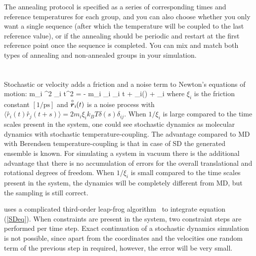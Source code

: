 The annealing protocol is specified as a series of corresponding times and 
reference temperatures for each group, and you can also choose whether you only
want a single sequence (after which the temperature will be coupled to the 
last reference value), or if the annealing should be periodic and restart at 
the first reference point once the sequence is completed. You can mix and
match both types of annealing and non-annealed groups in your simulation.

\newcommand{\vrond}{\stackrel{\circ}{\ve{r}}}
\newcommand{\rond}{\stackrel{\circ}{r}}
\newcommand{\ruis}{\ve{r}^G}

\section{}
\label{sec:SD}
Stochastic or velocity  adds a friction
and a noise term to Newton's equations of motion:
\beq
\label{SDeq}
m_i {\de^2 _i \over \de t^2} =
- m_i \xi_i {\de {}_i \over \de t} + _i() + \vrond_i
\eeq 
where $\xi_i$ is the friction constant $[1/\mbox{ps}]$ and
$\vrond_i\!\!(t)$  is a noise process with 
$\langle \rond_i\!\!(t) \rond_j\!\!(t+s) \rangle = 
    2 m_i \xi_i k_B T \delta(s) \delta_{ij}$.
When $1/\xi_i$ is large compared to the time scales present in the system,
one could see stochastic dynamics as molecular dynamics with stochastic
temperature-coupling. The advantage compared to MD with Berendsen
temperature-coupling is that in case of SD the generated ensemble is known.
For simulating a system in vacuum there is the additional advantage that there is no
accumulation of errors for the overall translational and rotational
degrees of freedom.
When $1/\xi_i$ is small compared to the time scales present in the system,
the dynamics will be completely different from MD, but the sampling is
still correct.

{\gromacs} uses a complicated third-order leap-frog
algorithm~\cite{Gunsteren88} to integrate equation (\ref{SDeq}).
When constraints are present in the system,
two constraint steps are performed per time step.
Exact continuation of a stochastic dynamics simulation is not possible,
since apart from the coordinates and the velocities one random term of the
previous step in required, however, the error will be very small.

